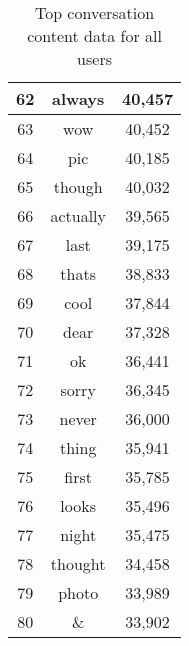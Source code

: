 \begin{table}[!htbp]
\begin{minipage}[b]{.5\textwidth}
\begin{tabular}{|c|c|c|}
		62 & always & 40,457 \\ \hline
		63 & wow & 40,452 \\ \hline
		64 & pic & 40,185 \\ \hline
		65 & though & 40,032 \\ \hline
		66 & actually & 39,565 \\ \hline
		67 & last & 39,175 \\ \hline
		68 & thats & 38,833 \\ \hline
		69 & cool & 37,844 \\ \hline
		70 & dear & 37,328 \\ \hline
		71 & ok & 36,441 \\ \hline
		72 & sorry & 36,345 \\ \hline
		73 & never & 36,000 \\ \hline
		74 & thing & 35,941 \\ \hline
		75 & first & 35,785 \\ \hline
		76 & looks & 35,496 \\ \hline
		77 & night & 35,475 \\ \hline
		78 & thought & 34,458 \\ \hline
		79 & photo & 33,989 \\ \hline
		80 & \& & 33,902 \\ \hline
	\end{tabular}
\end{minipage}
	\caption{Top conversation content data for all users}
	\label{tab:revpol}
\end{table}


